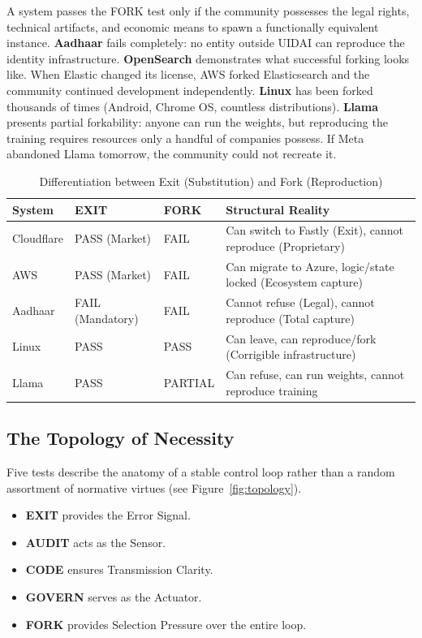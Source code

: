 \documentclass{article}
\begin{document}
A system passes the FORK test only if the community possesses the legal rights, technical artifacts, and economic means to spawn a functionally equivalent instance. \textbf{Aadhaar} fails completely: no entity outside UIDAI can reproduce the identity infrastructure. \textbf{OpenSearch} demonstrates what successful forking looks like. When Elastic changed its license, AWS forked Elasticsearch and the community continued development independently. \textbf{Linux} has been forked thousands of times (Android, Chrome OS, countless distributions). \textbf{Llama} presents partial forkability: anyone can run the weights, but reproducing the training requires resources only a handful of companies possess. If Meta abandoned Llama tomorrow, the community could not recreate it.

\begin{table}[htbp]
\centering
\begin{tabular}{@{}llll@{}}
\toprule
\textbf{System} & \textbf{EXIT} & \textbf{FORK} & \textbf{Structural Reality} \\
\midrule
Cloudflare & PASS (Market) & FAIL & Can switch to Fastly (Exit), cannot reproduce (Proprietary) \\
AWS & PASS (Market) & FAIL & Can migrate to Azure, logic/state locked (Ecosystem capture) \\
Aadhaar & FAIL (Mandatory) & FAIL & Cannot refuse (Legal), cannot reproduce (Total capture) \\
Linux & PASS & PASS & Can leave, can reproduce/fork (Corrigible infrastructure) \\
Llama & PASS & PARTIAL & Can refuse, can run weights, cannot reproduce training \\
\bottomrule
\end{tabular}
\caption{Differentiation between Exit (Substitution) and Fork (Reproduction)}
\end{table}

\subsection{The Topology of Necessity}

Five tests describe the anatomy of a stable control loop rather than a random assortment of normative virtues (see Figure~\ref{fig:topology}).

\begin{itemize}[noitemsep,topsep=0pt]
    \item \textbf{EXIT} provides the Error Signal.
    \item \textbf{AUDIT} acts as the Sensor.
    \item \textbf{CODE} ensures Transmission Clarity.
    \item \textbf{GOVERN} serves as the Actuator.
    \item \textbf{FORK} provides Selection Pressure over the entire loop.
\end{itemize}
\end{document}
